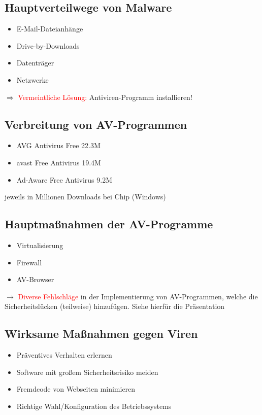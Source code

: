 \documentclass[
	11pt,
	DIV=15,
	parskip=full,    %
]{scrartcl}
\begin{document}
	\subsection*{Hauptverteilwege von Malware}
	\begin{itemize}
		\itemsep-1pt
		\item E-Mail-Dateianhänge
		\item Drive-by-Downloads
		\item Datenträger
		\item Netzwerke
	\end{itemize}
	
	$\Rightarrow$ \textcolor{red}{Vermeintliche Lösung:} Antiviren-Programm installieren!
	
	\subsection*{Verbreitung von AV-Programmen}
	\begin{itemize}
		\itemsep-1pt
		\item{AVG Antivirus Free 22.3M}
		\item{avast Free Antivirus 19.4M}
		\item{Ad-Aware Free Antivirus 9.2M}
	\end{itemize}
	jeweils in Millionen Downloads bei Chip (Windows)
	
	\subsection*{Hauptmaßnahmen der AV-Programme}
	\begin{itemize}
		\itemsep-1pt
		\item Virtualisierung
		\item Firewall
		\item AV-Browser
	\end{itemize}
	
	$\rightarrow$ \textcolor{red}{Diverse Fehlschläge} in der Implementierung von AV-Programmen, welche die Sicherheitslücken (teilweise) hinzufügen. Siehe hierfür die Präsentation
	
	\subsection*{Wirksame Maßnahmen gegen Viren}
	\begin{itemize}
		\itemsep-1pt
		\item Präventives Verhalten erlernen
		\item Software mit großem Sicherheitsrisiko meiden
		\item Fremdcode von Webseiten minimieren
		\item Richtige Wahl/Konfiguration des Betriebssystems
	\end{itemize}
	
\end{document}
